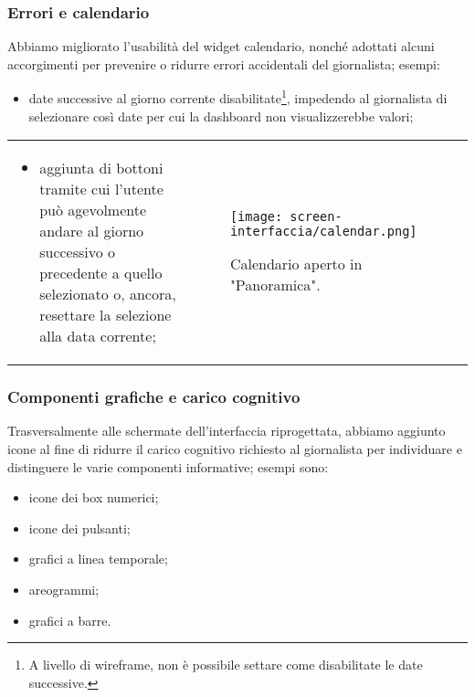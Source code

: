 \begin{frame}
    \frametitle{Errori e calendario}
    \label{f:errori}
    Abbiamo migliorato l'usabilità del widget calendario, nonché adottati alcuni accorgimenti per prevenire o ridurre errori accidentali del giornalista; esempi:
    \begin{itemize}
        \item date successive al giorno corrente disabilitate\footnote{A livello di wireframe, non è possibile settare come disabilitate le date successive.}, impedendo al giornalista di selezionare così date per cui la dashboard non visualizzerebbe valori;
    \end{itemize}
    \hspace{-8pt}
    \begin{tabular}{p{}p{}}    
        \begin{itemize}
            \item aggiunta di bottoni tramite cui l'utente può agevolmente andare al giorno successivo o precedente a quello selezionato o, ancora, resettare la selezione alla data corrente; 
        \end{itemize} &
            
        \begin{figure}
            \centering
            \vspace{-10pt}
            \texttt{[image: screen-interfaccia/calendar.png]}
            \caption{Calendario aperto in "Panoramica".} 
        \end{figure}  \\
    \end{tabular}   
    
\end{frame}

\begin{frame}
    \frametitle{Componenti grafiche e carico cognitivo}
    \label{f:grafica}
    Trasversalmente alle schermate dell'interfaccia riprogettata, abbiamo aggiunto icone al fine di ridurre il carico cognitivo richiesto al giornalista per individuare e distinguere le varie componenti informative; esempi sono:
    \begin{itemize}
        \item icone dei box numerici;
        \item icone dei pulsanti;
        \item grafici a linea temporale;
        \item areogrammi;
        \item grafici a barre.
    \end{itemize}
\end{frame}

